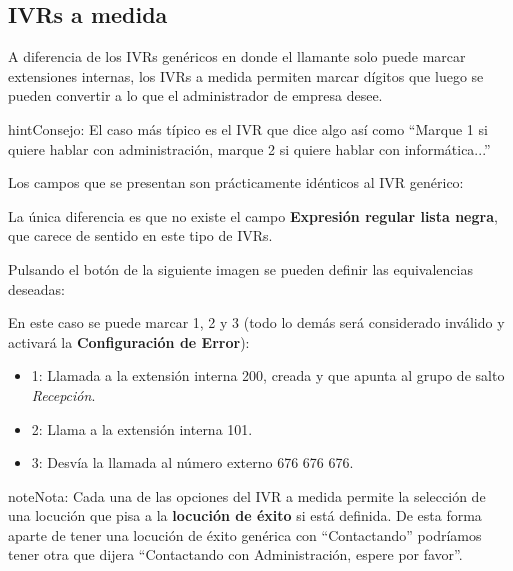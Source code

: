 \documentclass[letterpaper,10pt,spanish]{sphinxmanual}
\begin{document}
\subsection{IVRs a medida}
\label{pbx_features/ivrs:ivrs-a-medida}\label{pbx_features/ivrs:custom-ivrs}
A diferencia de los IVRs genéricos en donde el llamante solo puede marcar extensiones internas, los IVRs a medida permiten marcar dígitos que luego se pueden convertir a lo que el administrador de empresa desee.

\begin{notice}{hint}{Consejo:}
El caso más típico es el IVR que dice algo así como ``Marque 1 si quiere hablar con administración, marque 2 si quiere hablar con informática...''
\end{notice}

Los campos que se presentan son prácticamente idénticos al IVR genérico:

\noindent{}

La única diferencia es que no existe el campo \textbf{Expresión regular lista negra}, que carece de sentido en este tipo de IVRs.

Pulsando el botón de la siguiente imagen se pueden definir las equivalencias deseadas:

\noindent{}

En este caso se puede marcar 1, 2 y 3 (todo lo demás será considerado inválido y activará la \textbf{Configuración de Error}):

\noindent{}
\begin{itemize}
\item {} 
1: Llamada a la extensión interna 200, creada {\hyperref[pbx_features/huntgroups:huntgroups]{}} y que apunta al grupo de salto \emph{Recepción}.

\item {} 
2: Llama a la extensión interna 101.

\item {} 
3: Desvía la llamada al número externo 676 676 676.

\end{itemize}

\begin{notice}{note}{Nota:}
Cada una de las opciones del IVR a medida permite la selección de una locución que pisa a la \textbf{locución de éxito} si está definida. De esta forma aparte de tener una locución de éxito genérica con ``Contactando'' podríamos tener otra que dijera ``Contactando con Administración, espere por favor''.
\end{notice}
\end{document}
